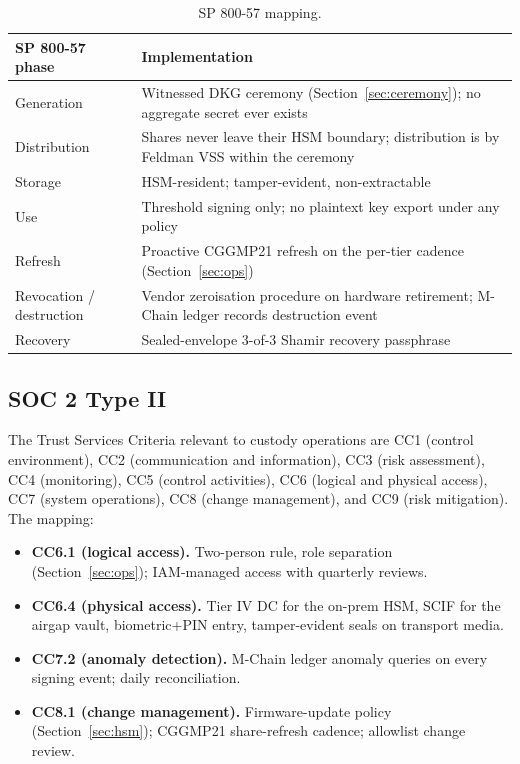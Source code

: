 \begin{table}[h]
\centering
\small
\begin{tabular}{p{4cm}p{10cm}}
\toprule
\textbf{SP 800-57 phase} & \textbf{Implementation} \\
\midrule
Generation &
Witnessed DKG ceremony (Section~\ref{sec:ceremony}); no aggregate
secret ever exists \\
Distribution &
Shares never leave their HSM boundary; distribution is by Feldman
VSS within the ceremony \\
Storage &
HSM-resident; tamper-evident, non-extractable \\
Use &
Threshold signing only; no plaintext key export under any policy \\
Refresh &
Proactive CGGMP21 refresh on the per-tier cadence
(Section~\ref{sec:ops}) \\
Revocation / destruction &
Vendor zeroisation procedure on hardware retirement; M-Chain ledger
records destruction event \\
Recovery &
Sealed-envelope 3-of-3 Shamir recovery passphrase \\
\bottomrule
\end{tabular}
\caption{SP 800-57 mapping.}
\label{tab:sp800-57}
\end{table}

\subsection{SOC 2 Type II}

The Trust Services Criteria \cite{soc2} relevant to custody operations
are CC1 (control environment), CC2 (communication and information),
CC3 (risk assessment), CC4 (monitoring), CC5 (control activities),
CC6 (logical and physical access), CC7 (system operations), CC8
(change management), and CC9 (risk mitigation). The mapping:

\begin{itemize}[nosep]
\item \textbf{CC6.1 (logical access).} Two-person rule, role
separation (Section~\ref{sec:ops}); IAM-managed access with quarterly
reviews.
\item \textbf{CC6.4 (physical access).} Tier IV DC for the on-prem
HSM, SCIF for the airgap vault, biometric+PIN entry, tamper-evident
seals on transport media.
\item \textbf{CC7.2 (anomaly detection).} M-Chain ledger anomaly
queries on every signing event; daily reconciliation.
\item \textbf{CC8.1 (change management).} Firmware-update policy
(Section~\ref{sec:hsm}); CGGMP21 share-refresh cadence; allowlist
change review.
\end{itemize}

